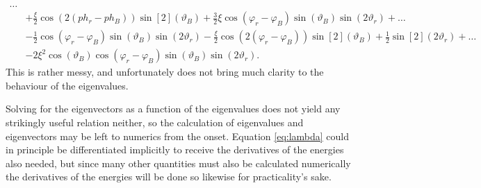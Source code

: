 \documentclass[a4paper]{article}
\begin{document}
\begin{align}
                \dots\nonumber\\
                &+ \frac{\xi}{2}\cos(2(ph_r-ph_B))\sin[2](\vartheta_B) +
                \frac{3}{2}\xi\cos(\varphi_r-\varphi_B)\sin(\vartheta_B)\sin(2\vartheta_r)
                +\dots\nonumber\\
                &- \frac{1}{2}\cos(\varphi_r-\varphi_B)\sin(\vartheta_B)\sin(2\vartheta_r)
                - \frac{\xi}{2}\cos(2(\varphi_r-\varphi_B))\sin[2](\vartheta_B) +
                \frac{1}{2}\sin[2](2\vartheta_r)+\dots\nonumber\\
                &- 2\xi^2\cos(\vartheta_B)\cos(\varphi_r-\varphi_B)\sin(\vartheta_B)\sin(2\vartheta_r)
                 \label{eq:lambda}
.\end{align} %
This is rather messy, and unfortunately does not bring much clarity to the behaviour of the
eigenvalues. 

Solving for the eigenvectors as a function of the eigenvalues does not yield any strikingly
useful relation neither, so the calculation of eigenvalues and eigenvectors may be left to numerics from
the onset. Equation \ref{eq:lambda} could in principle be differentiated implicitly to
receive the derivatives of the energies also needed, but since many other quantities must
also be calculated numerically the derivatives of the energies will be done so likewise for
practicality's sake.
\end{document}
